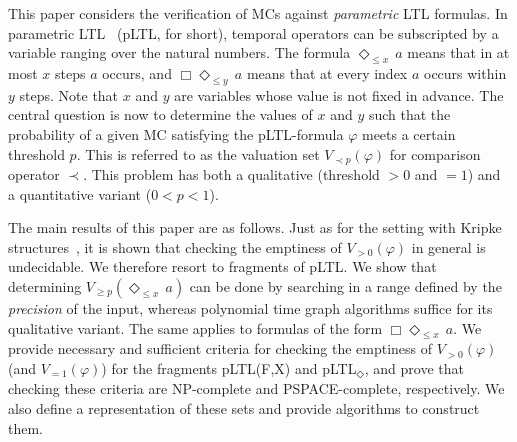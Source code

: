 \documentclass{llncs}
\renewcommand{\leq}{\leqslant}
\renewcommand{\geq}{\geqslant}
\newcommand{\de}{\Diamond}
\begin{document}
This paper considers the verification of MCs against \emph{parametric} LTL formulas.
In parametric LTL~\cite{DBLP:journals/tocl/AlurETP01} (pLTL, for short), temporal operators can be subscripted by a variable ranging over the natural numbers.
The formula $\de_{\leq x} \, a$ means that in at most $x$ steps $a$ occurs, and $\Box \de_{\leq y} \, a$ means that at every
index $a$ occurs within $y$ steps. 
Note that $x$ and $y$ are variables whose value is not fixed in advance.
The central question is now to determine the values of $x$ and $y$ such that the probability of a given MC satisfying the pLTL-formula $\varphi$ meets a certain 
threshold $p$.
This is referred to as the valuation set $V_{\prec p}(\varphi)$ for comparison operator $\prec$.
This problem has both a qualitative (threshold $> 0$ and $= 1$) and a quantitative variant ($0 < p < 1$).

The main results of this paper are as follows.
Just as for the setting with Kripke structures~\cite{DBLP:journals/tocl/AlurETP01}, it is shown that checking the emptiness of $V_{> 0}(\varphi)$ in 
general is undecidable.
We therefore resort to fragments of pLTL.
We show that determining $V_{\geq p}(\de_{\leq x} \, a)$ can be done by searching in a range defined by the \emph{precision} of the input, 
whereas polynomial time 
graph algorithms suffice for its qualitative variant.
The same applies to formulas of the form $\Box \de_{\leq x} \, a$.
We provide necessary and sufficient criteria for checking the emptiness of $V_{> 0}(\varphi)$ (and $V_{=1}(\varphi)$)
for the fragments pLTL(F,X) and pLTL$_\de$, and prove that checking these criteria are NP-complete and PSPACE-complete, respectively. 
We also define a representation of these sets and provide algorithms to construct them. 
\end{document}
